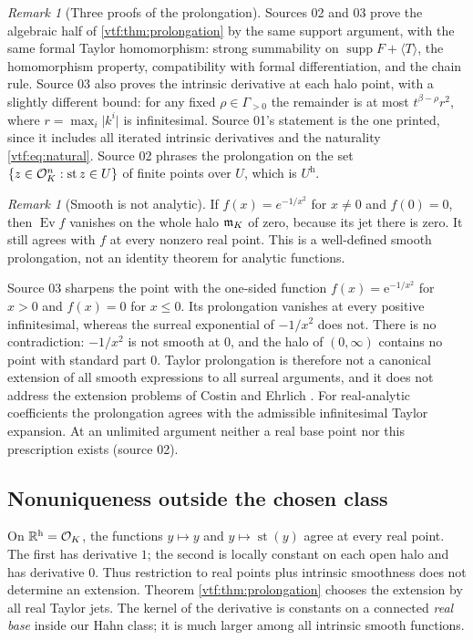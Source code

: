 \documentclass[11pt,letterpaper]{article}
\theoremstyle{definition}
\theoremstyle{remark}
\newtheorem{remark}[theorem]{Remark}
\newcommand{\R}{\mathbb R}\newcommand{\C}{\mathbb C}
\newcommand{\supp}{\operatorname{supp}}\newcommand{\st}{\operatorname{st}}
\newcommand{\ev}{\operatorname{Ev}}\newcommand{\jet}{\operatorname{J}}
\newcommand{\halo}[1]{#1^{\mathrm h}}
\newcommand{\abs}[1]{\lvert#1\rvert}\newcommand{\norm}[1]{\lVert#1\rVert}
\newcommand{\e}{\mathrm e}
\begin{document}
\begin{remark}[Three proofs of the prolongation]
Sources 02 and 03 prove the algebraic half of \cref{vtf:thm:prolongation} by the
same support argument, with the same formal Taylor homomorphism: strong
summability on $\supp F+\langle T\rangle$, the homomorphism property,
compatibility with formal differentiation, and the chain rule. Source 03 also
proves the intrinsic derivative at each halo point, with a slightly different
bound: for any fixed $\rho\in\Gamma_{>0}$ the remainder is at most
$t^{\beta-\rho}r^2$, where $r=\max_i\abs{k^i}$ is infinitesimal. Source 01's
statement is the one printed, since it includes all iterated intrinsic
derivatives and the naturality \eqref{vtf:eq:natural}. Source 02 phrases the
prolongation on the set $\{z\in\OO_K^n:\st z\in U\}$ of finite points over $U$,
which is $\halo U$.
\end{remark}

\begin{remark}[Smooth is not analytic]
If $f(x)=e^{-1/x^2}$ for $x\ne0$ and $f(0)=0$, then $\ev f$ vanishes on
the whole halo $\mathfrak m_K$ of zero, because its jet there is zero. It still agrees
with $f$ at every nonzero real point. This is a well-defined smooth
prolongation, not an identity theorem for analytic functions.
\end{remark}

Source 03 sharpens the point with the one-sided function $f(x)=\e^{-1/x^2}$ for
$x>0$ and $f(x)=0$ for $x\le0$. Its prolongation vanishes at every positive
infinitesimal, whereas the surreal exponential of $-1/x^2$ does not. There is no
contradiction: $-1/x^2$ is not smooth at $0$, and the halo of $(0,\infty)$
contains no point with standard part $0$. Taylor prolongation is therefore not a
canonical extension of all smooth expressions to all surreal arguments, and it
does not address the extension problems of Costin and Ehrlich \cite{CE}. For
real-analytic coefficients the prolongation agrees with the admissible
infinitesimal Taylor expansion. At an unlimited argument neither a real base
point nor this prescription exists (source 02).

\subsection{Nonuniqueness outside the chosen class}\label{vtf:subsec:nonunique}

On $\halo\R=\OO_K$, the functions $y\mapsto y$ and $y\mapsto\st(y)$
agree at every real point. The first has derivative $1$; the second is locally
constant on each open halo and has derivative $0$. Thus restriction to real
points plus intrinsic smoothness does not determine an extension. Theorem
\ref{vtf:thm:prolongation} chooses the extension by all real Taylor jets.
The kernel of the derivative is constants on a connected \emph{real base}
inside our Hahn class; it is much larger among all intrinsic smooth functions.
\end{document}
